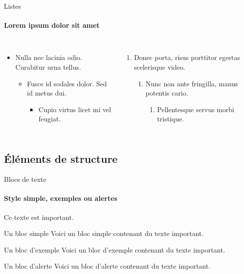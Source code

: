 \documentclass{beamer}
\begin{document}
\begin{frame}[label=lists]{Listes}
\framesubtitle{Lorem ipsum dolor sit amet}
\begin{columns}[onlytextwidth]
    \begin{itemize}
    \item Nulla nec lacinia odio. Curabitur urna tellus.
    \begin{itemize}
        \item Fusce id sodales dolor. Sed id metus dui.
        \begin{itemize}
        \item Cupio virtus licet mi vel feugiat.
        \end{itemize}
    \end{itemize}
    \end{itemize}
    \begin{enumerate}
    \item Donec porta, risus porttitor egestas scelerisque video.
    \begin{enumerate}
        \item Nunc non ante fringilla, manus potentis cario.
        \begin{enumerate}
        \item Pellentesque servus morbi tristique.
        \end{enumerate}
    \end{enumerate}
    \end{enumerate}
\end{columns}
\end{frame}

\subsection{Éléments de structure}
\begin{frame}[label=simmonshall]{Blocs de texte}
    \framesubtitle{Style simple, exemples ou \alert{alertes}}
    \alert{Ce texte} est important.

    \begin{block}{Un bloc simple}
    Voici un bloc simple contenant \alert{du texte important}.
    \end{block}
    \begin{exampleblock}{Un bloc d'exemple}
    Voici un bloc d'exemple contenant \alert{du texte important}.
    \end{exampleblock}
    \begin{alertblock}{Un bloc d'alerte}
    Voici un bloc d'alerte contenant \alert{du texte important}.
    \end{alertblock}
\end{frame}
\end{document}
